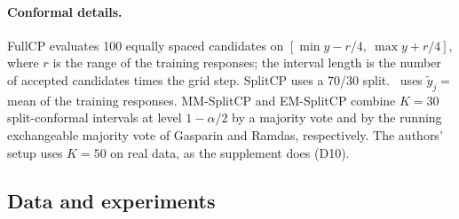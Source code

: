 \paragraph{Conformal details.} FullCP evaluates 100 equally spaced candidates on $[\min y-r/4,\ \max y+r/4]$, where
$r$ is the range of the training responses; the interval length is the number of accepted candidates times the grid
step. SplitCP uses a 70/30 split. \RO\ uses $\tilde y_j=$ mean of the training responses. MM-SplitCP and EM-SplitCP
combine $K=30$ split-conformal intervals at level $1-\alpha/2$ by a majority vote and by the running exchangeable
majority vote of Gasparin and Ramdas\supercite{gasparin2024merging}, respectively. The authors' setup uses $K=50$
on real data, as the supplement does (D10).

\subsection{Data and experiments}

